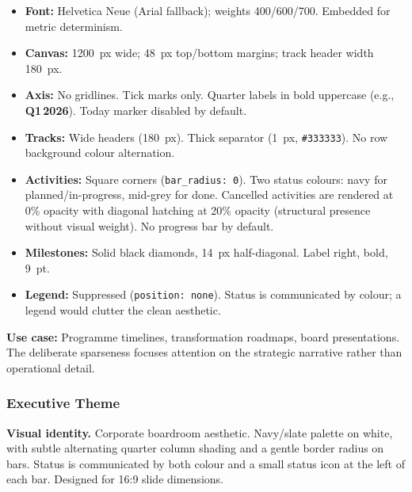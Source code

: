 \begin{itemize}
  \item \textbf{Font:} Helvetica Neue (Arial fallback); weights 400/600/700. Embedded for
        metric determinism.
  \item \textbf{Canvas:} 1200~px wide; 48~px top/bottom margins; track header width 180~px.
  \item \textbf{Axis:} No gridlines. Tick marks only. Quarter labels in bold uppercase
        (e.g., \textbf{Q1\,2026}). Today marker disabled by default.
  \item \textbf{Tracks:} Wide headers (180~px). Thick separator (1~px, \texttt{\#333333}).
        No row background colour alternation.
  \item \textbf{Activities:} Square corners (\texttt{bar\_radius: 0}). Two status colours:
        navy for planned/in-progress, mid-grey for done. Cancelled activities are rendered
        at 0\% opacity with diagonal hatching at 20\% opacity (structural presence without
        visual weight). No progress bar by default.
  \item \textbf{Milestones:} Solid black diamonds, 14~px half-diagonal. Label right, bold,
        9~pt.
  \item \textbf{Legend:} Suppressed (\texttt{position: none}). Status is communicated by
        colour; a legend would clutter the clean aesthetic.
\end{itemize}

\textbf{Use case:} Programme timelines, transformation roadmaps, board presentations. The
deliberate sparseness focuses attention on the strategic narrative rather than operational
detail.

\subsubsection{Executive Theme}
\label{sec:theme-executive}

\textbf{Visual identity.}
Corporate boardroom aesthetic. Navy/slate palette on white, with subtle alternating quarter
column shading and a gentle border radius on bars. Status is communicated by both colour and
a small status icon at the left of each bar. Designed for 16:9 slide dimensions.


